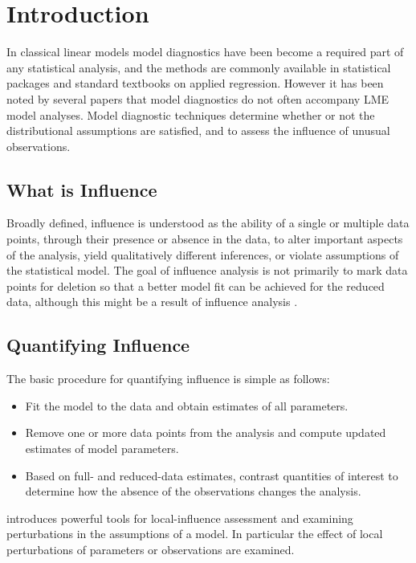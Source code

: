 \documentclass[Main.tex]{subfiles}
\begin{document}


	\section{Introduction}%
	In classical linear models model diagnostics have been become a required part of any statistical analysis, and the methods are commonly available in statistical packages and standard textbooks on applied regression. However it has been noted by several papers that model diagnostics do not often accompany LME model analyses.
	Model diagnostic techniques determine whether or not the distributional assumptions are satisfied, and to assess the influence of unusual observations.
	
	\subsection{What is Influence} %
	
	
	Broadly defined, influence is understood as the ability of a single or multiple data points, through their presence or absence in the data, to alter important aspects of the analysis, yield qualitatively different inferences, or violate assumptions of the statistical model. The goal of influence analysis is not primarily to mark data
	points for deletion so that a better model fit can be achieved for the reduced data, although this might be a result of influence analysis \citep{schabenberger}.
	
	
	\subsection{Quantifying Influence}  %
	
	
	The basic procedure for quantifying influence is simple as follows:
	
	
	\begin{itemize}
		\item Fit the model to the data and obtain estimates of all parameters.
		\item Remove one or more data points from the analysis and compute updated estimates of model parameters.
		\item Based on full- and reduced-data estimates, contrast quantities of interest to determine how the absence of the observations changes the analysis.
	\end{itemize}
	
	
	\citet{cook86} introduces powerful tools for local-influence assessment and examining perturbations in the assumptions of a model. In particular the effect of local perturbations of parameters or observations are examined.
	
\end{document}
